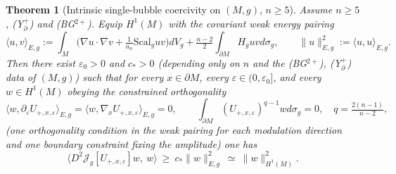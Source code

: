 \documentclass[10pt,a4paper]{amsart}
\newtheorem{theorem}{Theorem}
\newcommand{\Scal}{\mathrm{Scal}}
\begin{document}
\begin{theorem}[Intrinsic single-bubble coercivity on $(M,g)$, $n\ge5$]\label{thm:intrinsic-single-gap}
Assume $n\ge5$, \textup{(Y$^+_{\partial}$)} and \textup{(BG$^{2+}$)}. Equip $H^1(M)$ with the covariant weak energy pairing
\[
\langle u,v\rangle_{E,g}
:=\int_M\Big(\nabla u\cdot\nabla v+\tfrac{1}{a_n}\Scal_guv\Big)dV_g
  +\tfrac{n-2}{2}\int_{\partial M}H_guvd\sigma_g,
\qquad
\|u\|_{E,g}^2:=\langle u,u\rangle_{E,g}.
\]
Then there exist $\varepsilon_0>0$ and $c_\ast>0$ (depending only on $n$ and the \textup{(BG$^{2+}$)}, \textup{(Y$^+_{\partial}$)} data of $(M,g)$) such that for every $x\in\partial M$, every $\varepsilon\in(0,\varepsilon_0]$, and every $w\in H^1(M)$ obeying the \emph{constrained orthogonality}
\begin{equation}\label{eq:esc-orthog-gauge-final}
\langle w,\partial_\varepsilon U_{+,x,\varepsilon}\rangle_{E,g}
=\langle w,\nabla_x U_{+,x,\varepsilon}\rangle_{E,g}=0,
\qquad
\int_{\partial M} (U_{+,x,\varepsilon})^{q-1}wd\sigma_g=0,
\quad q=\tfrac{2(n-1)}{n-2},
\end{equation}
(one orthogonality condition in the weak pairing for each modulation direction and one boundary constraint fixing the amplitude) one has
\begin{equation}\label{eq:intrinsic-gap-final}
\big\langle D^2\mathcal J_g[U_{+,x,\varepsilon}]w,\ w\big\rangle
\ \ge\ c_\ast\|w\|_{E,g}^2
\ \simeq\ \|w\|_{H^1(M)}^2 .
\end{equation}
\end{theorem}
\end{document}
